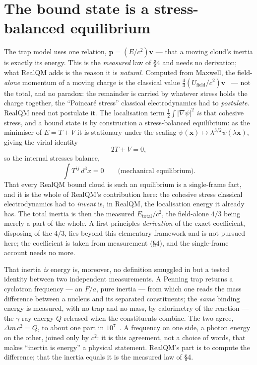 \documentclass[11pt]{article}
\begin{document}
\section{The bound state is a stress-balanced equilibrium}
The trap model uses one relation, $\mathbf p=(E/c^2)\mathbf v$ --- that a moving cloud's inertia is exactly its
energy. This is the \emph{measured} law of \S4 and needs no derivation; what RealQM adds is the reason it is
\emph{natural}. Computed from Maxwell, the field-\emph{alone} momentum of a moving charge is the classical value
$\tfrac43(U_{\text{field}}/c^2)\mathbf v$~\cite{Thomson,Abraham} --- not the total, and no paradox: the remainder is
carried by whatever stress holds the charge together, the ``Poincar\'e stress'' classical electrodynamics had to
\emph{postulate}. RealQM need not postulate it. The localisation term $\tfrac12\int|\nabla\psi|^2$ \emph{is} that
cohesive stress, and a bound state is by construction a stress-balanced equilibrium: as the minimiser of $E=T+V$ it
is stationary under the scaling $\psi(\mathbf x)\mapsto\lambda^{3/2}\psi(\lambda\mathbf x)$, giving the virial
identity
\begin{equation}
2T+V=0,
\label{eq:virial}
\end{equation}
so the internal stresses balance,
\begin{equation}
\int T^{ij}\,d^3x=0 \qquad\text{(mechanical equilibrium).}
\label{eq:laue}
\end{equation}
That every RealQM bound cloud is such an equilibrium is a single-frame fact, and it is the whole of RealQM's
contribution here: the cohesive stress classical electrodynamics had to \emph{invent} is, in RealQM, the
localisation energy it already has. The total inertia is then the measured $E_{\text{total}}/c^2$, the field-alone
$4/3$ being merely a part of the whole. A first-principles \emph{derivation} of the exact coefficient, disposing of
the $4/3$, lies beyond this elementary framework and is not pursued here; the coefficient is taken from measurement
(\S4), and the single-frame account needs no more.

That inertia \emph{is} energy is, moreover, no definition smuggled in but a tested identity between two independent
measurements. A Penning trap returns a cyclotron frequency --- an $F/a$, pure inertia --- from which one reads the
mass difference between a nucleus and its separated constituents; the \emph{same} binding energy is measured, with
no trap and no mass, by calorimetry of the reaction --- the $\gamma$-ray energy $Q$ released when the constituents
combine. The two agree, $\Delta m\,c^2=Q$, to about one part in $10^{7}$~\cite{Rainville}. A frequency on one side, a photon energy
on the other, joined only by $c^2$: it is this agreement, not a choice of words, that makes ``inertia is energy''
a physical statement. RealQM's part is to compute the difference; that the inertia equals it is the measured law of \S4.
\end{document}
